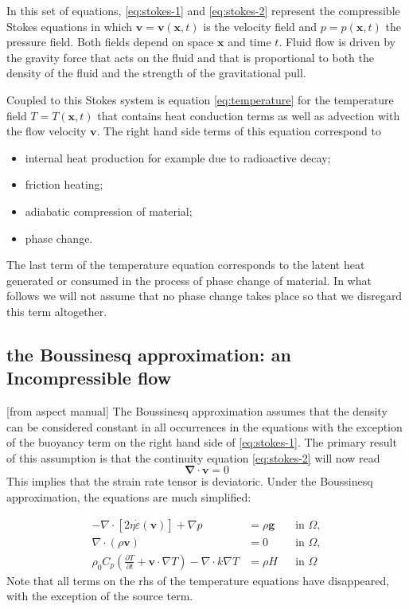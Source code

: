 \documentclass[a4paper]{article}
\begin{document}
In this set of equations, \eqref{eq:stokes-1} and \eqref{eq:stokes-2}
represent the compressible Stokes equations in which $\mathbf v=\mathbf
v(\mathbf x,t)$ is the velocity field and $p=p(\mathbf x,t)$ the pressure
field. Both fields depend on space $\mathbf x$ and time $t$. Fluid flow is
driven by the gravity force that acts on the fluid and that is proportional to
both the density of the fluid and the strength of the gravitational pull.

Coupled to this Stokes system is equation \eqref{eq:temperature} for the
temperature field $T=T(\mathbf x,t)$ that contains heat conduction terms as
well as advection with the flow velocity $\mathbf v$. The right hand side
terms of this equation correspond to
\begin{itemize}
\item internal heat production for example due to radioactive decay;
\item friction heating;
\item adiabatic compression of material;
\item phase change.
\end{itemize}
The last term of the temperature equation corresponds to
the latent heat generated or consumed in the process of phase change of material. 
In what follows we will not assume that no phase change takes place so that we disregard this term 
altogether.

\subsection{the Boussinesq approximation: an Incompressible flow}

[from aspect manual]
The Boussinesq approximation assumes that the density can be
considered constant in all occurrences in the equations with the exception of
the buoyancy term on the right hand side of \eqref{eq:stokes-1}. The primary
result of this assumption is that the continuity equation \eqref{eq:stokes-2}
will now read
\[
{\bm \nabla}\cdot{\bm v} = 0
\]
This implies that the strain rate tensor is deviatoric.
Under the Boussinesq approximation, the equations are much simplified:

\begin{align}
  \label{eq:stokes-1}
  -\nabla \cdot \left[2\eta \dot\varepsilon(\bm v)
                \right] + \nabla p &=
  \rho \bm g
  &
  & \textrm{in $\Omega$},
  \\
  \label{eq:stokes-2}
  \nabla \cdot (\rho \bm v) &= 0
  &
  & \textrm{in $\Omega$},
  \\
  \label{eq:temperature}
  \rho_0 C_p \left(\frac{\partial T}{\partial t} + \bm v\cdot\nabla T\right)
  - \nabla\cdot k\nabla T
  &=
  \rho H
  &
  & \textrm{in $\Omega$}
\end{align}
Note that all terms on the rhs of the temperature equations have disappeared, with the exception 
of the source term.
\end{document}
